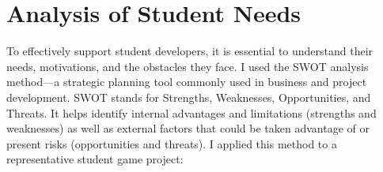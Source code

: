 \section{Analysis of Student Needs}\label{sec:swot}
To effectively support student developers, it is essential to understand their needs, motivations, and the obstacles they face. I used the SWOT analysis method—a strategic planning tool commonly used in business and project development. SWOT stands for Strengths, Weaknesses, Opportunities, and Threats. It helps identify internal advantages and limitations (strengths and weaknesses) as well as external factors that could be taken advantage of or present risks (opportunities and threats)\cite{investopedia-swot}. I applied this method to a representative student game project:

